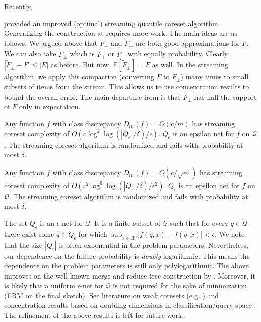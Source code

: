 \documentclass[12pt]{colt2019} %
\newcommand{\E}{\mathbb{E}}
\newcommand{\eps}{\epsilon}
\newcommand{\X}{\mathcal{X}}
\newcommand{\Q}{\mathcal{Q}}
\begin{document}
Recently, {\cite{DBLP:conf/focs/KarninLL16} provided an improved (optimal) streaming quantile coreset algorithm. 
Generalizing the construction at  \cite{DBLP:conf/focs/KarninLL16} requires more work. 
The main ideas are as follows. 
We argued above that $\tilde F_{+}$ and $\tilde F_{-}$ are both good approximations for $F$. 
We can also take $\tilde F_{\pm}$ which is $\tilde F_{+}$ or $\tilde F_{-}$ with equally probability. 
Clearly $|\tilde F_{\pm} - F| \le |E|$ as before. But now, $\E[\tilde F_{\pm}] = F$ as well. 
In the streaming algorithm, we apply this compaction (converting $F$ to $\tilde F_{\pm}$) many times to small subsets of items from the stream. This allows us to use concentration results to bound the overall error. 
The main departure from \cite{DBLP:conf/focs/KarninLL16} is that $\tilde F_{\pm}$ has half the support of $F$ only in expectation.

\begin{theorem} \label{thm:streaming12}
Any function $f$ with class discrepancy $D_m(f) = O(c/m)$ has streaming coreset complexity of $O\left(c\log^2\log(|Q_\eps|/\delta)/\eps\right)$.
$Q_\eps$ is an epsilon net for $f$ on $\Q$. 
The streaming coreset algorithm is randomized and fails with probability at most $\delta$.
\end{theorem}

\begin{theorem} \label{thm:streaming22}
Any function $f$ with class discrepancy $D_m(f) = O(c/\sqrt{m})$ has streaming coreset complexity of $O\left(c^2\log^3\log(|Q_\eps|/\delta) /\eps^2\right)$.
$Q_\eps$ is an epsilon net for $f$ on $\Q$. 
The streaming coreset algorithm is randomized and fails with probability at most $\delta$.
\end{theorem}

The set $Q_\eps$ is an $\eps$-net for $\Q$. 
It is a finite subset of $\Q$ such that for every $q \in \Q$ there exist some $\tilde{q} \in Q_\eps$ for which $\sup_{x \in \X} |f(q,x) - f(\tilde{q},x)| < \eps$. 
We note that the size $|Q_\eps|$ is often exponential in the problem parameters. 
Nevertheless, our dependence on the failure probability is \emph{doubly} logarithmic. 
This means the dependence on the problem parameters is still only polylogarithmic.
The above improves on the well-known merge-and-reduce tree construction by \cite{BENTLEY1980301}.
Moreover, it is likely that a uniform $\eps$-net for $\Q$ is not required for the sake of minimization (ERM on the final sketch).
See literature on weak coresets (e.g. \cite{Feldman:2007:PKC:1247069.1247072}) and concentration results based on doubling dimensions in classification/query space \cite{BSHOUTY2009323}. The refinement of the above results is left for future work.
 
}
\end{document}
